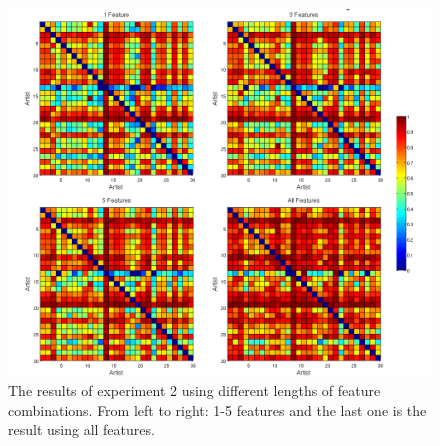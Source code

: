 \begin{figure}[htb]
  \centering
  \includegraphics[width=0.75\linewidth]{img/experiment2results.png}
  \caption{The results of experiment 2 using different lengths of feature combinations. From left to right: 1-5 features and the last one is the result using all features.}
  \label{fig:experiment2results}
\end{figure}

